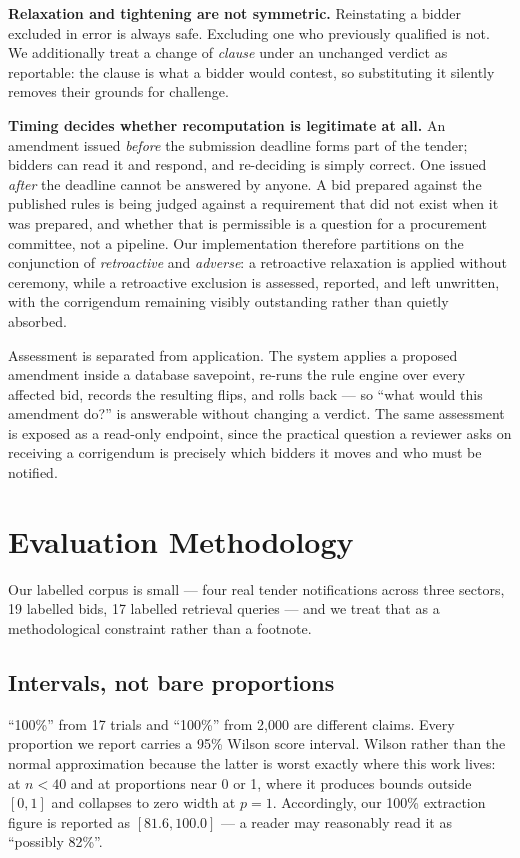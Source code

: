 \documentclass[conference]{IEEEtran}
\begin{document}
\textbf{Relaxation and tightening are not symmetric.} Reinstating a bidder
excluded in error is always safe. Excluding one who previously qualified is not.
We additionally treat a change of \emph{clause} under an unchanged verdict as
reportable: the clause is what a bidder would contest, so substituting it
silently removes their grounds for challenge.

\textbf{Timing decides whether recomputation is legitimate at all.} An
amendment issued \emph{before} the submission deadline forms part of the
tender; bidders can read it and respond, and re-deciding is simply correct. One
issued \emph{after} the deadline cannot be answered by anyone. A bid prepared
against the published rules is being judged against a requirement that did not
exist when it was prepared, and whether that is permissible is a question for a
procurement committee, not a pipeline. Our implementation therefore partitions
on the conjunction of \emph{retroactive} and \emph{adverse}: a retroactive
relaxation is applied without ceremony, while a retroactive exclusion is
assessed, reported, and left unwritten, with the corrigendum remaining visibly
outstanding rather than quietly absorbed.

Assessment is separated from application. The system applies a proposed
amendment inside a database savepoint, re-runs the rule engine over every
affected bid, records the resulting flips, and rolls back --- so ``what would
this amendment do?'' is answerable without changing a verdict. The same
assessment is exposed as a read-only endpoint, since the practical question a
reviewer asks on receiving a corrigendum is precisely which bidders it moves
and who must be notified.

\section{Evaluation Methodology}
\label{sec:method-eval}

Our labelled corpus is small --- four real tender notifications across three
sectors, 19 labelled bids, 17 labelled retrieval queries --- and we treat that
as a methodological constraint rather than a footnote.

\subsection{Intervals, not bare proportions}

``100\%'' from 17 trials and ``100\%'' from 2{,}000 are different claims. Every
proportion we report carries a 95\% Wilson score interval. Wilson rather than
the normal approximation because the latter is worst exactly where this work
lives: at $n<40$ and at proportions near 0 or 1, where it produces bounds
outside $[0,1]$ and collapses to zero width at $p=1$. Accordingly, our 100\%
extraction figure is reported as $[81.6, 100.0]$ --- a reader may reasonably
read it as ``possibly 82\%''.
\end{document}
